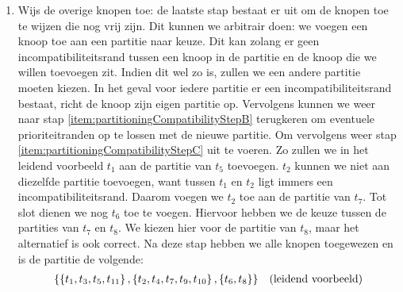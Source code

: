 \begin{enumerate}
 \item \label{item:partitioningCompatibilityStepC} Wijs de overige knopen toe: de laatste stap bestaat er uit om de knopen toe te wijzen die nog vrij zijn. Dit kunnen we arbitrair doen: we voegen een knoop toe aan een partitie naar keuze. Dit kan zolang er geen incompatibiliteitsrand tussen een knoop in de partitie en de knoop die we willen toevoegen zit. Indien dit wel zo is, zullen we een andere partitie moeten kiezen. In het geval voor iedere partitie er een incompatibiliteitsrand bestaat, richt de knoop zijn eigen partitie op. Vervolgens kunnen we weer naar stap \ref{item:partitioningCompatibilityStepB} terugkeren om eventuele prioriteitranden op te lossen met de nieuwe partitie. Om vervolgens weer stap \ref{item:partitioningCompatibilityStepC} uit te voeren. Zo zullen we in het leidend voorbeeld $t_1$ aan de partitie van $t_5$ toevoegen. $t_2$ kunnen we niet aan diezelfde partitie toevoegen, want tussen $t_1$ en $t_2$ ligt immers een incompatibiliteitsrand. Daarom voegen we $t_2$ toe aan de partitie van $t_7$. Tot slot dienen we nog $t_6$ toe te voegen. Hiervoor hebben we de keuze tussen de partities van $t_7$ en $t_8$. We kiezen hier voor de partitie van $t_8$, maar het alternatief is ook correct. Na deze stap hebben we alle knopen toegewezen en is de partitie de volgende:
\begin{equation}
\begin{array}{ll}
\left\{\left\{t_1,t_3,t_5,t_{11}\right\},\left\{t_2,t_4,t_7,t_9,t_{10}\right\},\left\{t_6,t_8\right\}\right\}&\mbox{(leidend voorbeeld)}
\end{array}
\end{equation}
\end{enumerate}
